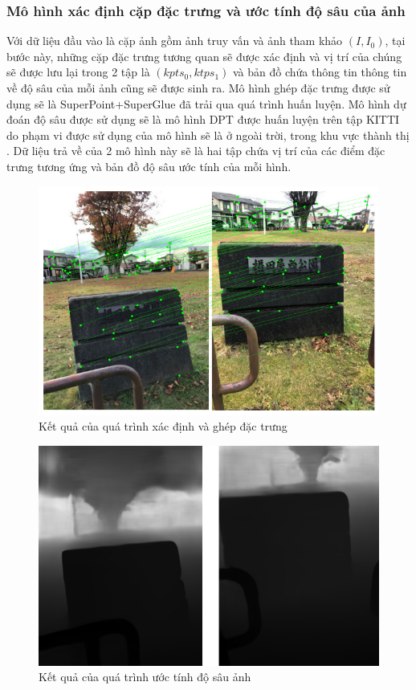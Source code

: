 \subsubsection{Mô hình xác định cặp đặc trưng và ước tính độ sâu của ảnh}

Với dữ liệu đầu vào là cặp ảnh gồm ảnh truy vấn và ảnh tham khảo $(I, I_0)$, tại bước này, những cặp đặc trưng tương quan sẽ được xác định và vị trí của chúng sẽ được lưu lại trong 2 tập là $(kpts_0, ktps_1)$ và bản đồ chứa thông tin thông tin về độ sâu của mỗi ảnh cũng sẽ được sinh ra. Mô hình ghép đặc trưng được sử dụng sẽ là SuperPoint+SuperGlue \cite{sarlin2020superglue} đã trải qua quá trình huấn luyện. Mô hình dự đoán độ sâu được sử dụng sẽ là mô hình DPT \cite{ranftl2021vision} được huấn luyện trên tập KITTI do phạm vi được sử dụng của mô hình sẽ là ở ngoài trời, trong khu vực thành thị \cite{arnold2022mapfree}. Dữ liệu trả về của 2 mô hình này sẽ là hai tập chứa vị trí của các điểm đặc trưng tương ứng và bản đồ độ sâu ước tính của mỗi hình.

\begin{figure}[H]
  \centering
  \includegraphics[scale=0.7]{pics/Proposal/matching.png}
  \caption{Kết quả của quá trình xác định và ghép đặc trưng}
\end{figure}

\begin{figure}[H]
  \centering
  \includegraphics[scale=0.6]{pics/Proposal/depth.png}
  \caption{Kết quả của quá trình ước tính độ sâu ảnh}
\end{figure}

